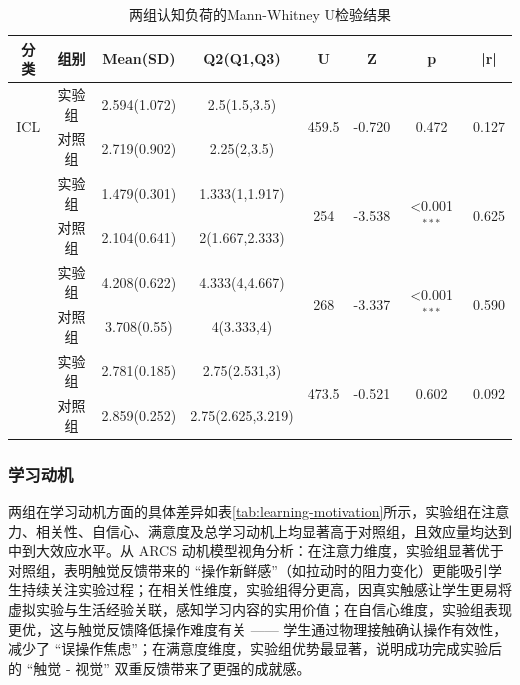 \documentclass[runningheads]{llncs}
\begin{document}
\begin{table}[t]
\centering
\setlength{\tabcolsep}{4.5pt} %
\caption{两组认知负荷的Mann-Whitney U检验结果}
\label{tab:cognitive-load}
\begin{tabularx}{\textwidth}{cccccccc}
\toprule
\textbf{分类} & \textbf{组别} & \textbf{Mean(SD)} & \textbf{Q2(Q1,Q3)} & \textbf{U} & \textbf{Z} & \textbf{p} & \textbf{|r|} \\
\midrule
\multirow{2}{*}{ICL} 
& 实验组 & 2.594(1.072) & 2.5(1.5,3.5) & \multirow{2}{*}{459.5} & \multirow{2}{*}{-0.720} & \multirow{2}{*}{0.472} & \multirow{2}{*}{0.127} \\
& 对照组 & 2.719(0.902) & 2.25(2,3.5) \\
\addlinespace
\multirow{2}{*}{ECL} 
& 实验组 & 1.479(0.301) & 1.333(1,1.917) & \multirow{2}{*}{254} & \multirow{2}{*}{-3.538} & \multirow{2}{*}{<0.001\(^{***}\)} & \multirow{2}{*}{0.625} \\
& 对照组 & 2.104(0.641) & 2(1.667,2.333) \\
\addlinespace
\multirow{2}{*}{GCL} 
& 实验组 & 4.208(0.622) & 4.333(4,4.667) & \multirow{2}{*}{268} & \multirow{2}{*}{-3.337} & \multirow{2}{*}{<0.001\(^{***}\)} & \multirow{2}{*}{0.590} \\
& 对照组 & 3.708(0.55) & 4(3.333,4) \\
\addlinespace
\multirow{2}{*}{Total} 
& 实验组 & 2.781(0.185) & 2.75(2.531,3) & \multirow{2}{*}{473.5} & \multirow{2}{*}{-0.521} & \multirow{2}{*}{0.602} & \multirow{2}{*}{0.092} \\
& 对照组 & 2.859(0.252) & 2.75(2.625,3.219) \\
\bottomrule
\end{tabularx}
\end{table}

\subsubsection{学习动机}
两组在学习动机方面的具体差异如表\ref{tab:learning-motivation}所示，实验组在注意力、相关性、自信心、满意度及总学习动机上均显著高于对照组，且效应量均达到中到大效应水平。从 ARCS 动机模型视角分析：在注意力维度，实验组显著优于对照组，表明触觉反馈带来的 “操作新鲜感”（如拉动时的阻力变化）更能吸引学生持续关注实验过程；在相关性维度，实验组得分更高，因真实触感让学生更易将虚拟实验与生活经验关联，感知学习内容的实用价值；在自信心维度，实验组表现更优，这与触觉反馈降低操作难度有关 —— 学生通过物理接触确认操作有效性，减少了 “误操作焦虑”；在满意度维度，实验组优势最显著，说明成功完成实验后的 “触觉 - 视觉” 双重反馈带来了更强的成就感。
\end{document}
